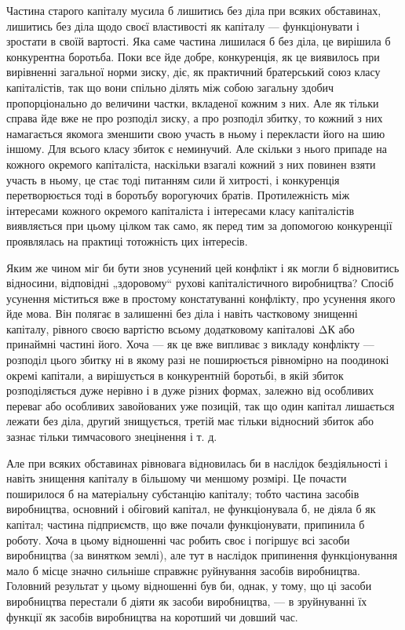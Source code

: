 Частина старого капіталу мусила б лишитись без діла при
всяких обставинах, лишитись без діла щодо своєї властивості як
капіталу — функціонувати і зростати в своїй вартості. Яка саме
частина лишилася б без діла, це вирішила б конкурентна боротьба.
Поки все йде добре, конкуренція, як це виявилось при
вирівненні загальної норми зиску, діє, як практичний братерський
союз класу капіталістів, так що вони спільно ділять між собою загальну
здобич пропорціонально до величини частки, вкладеної
кожним з них. Але як тільки справа йде вже не про розподіл
зиску, а про розподіл збитку, то кожний з них намагається
якомога зменшити свою участь в ньому і перекласти його на
шию іншому. Для всього класу збиток є неминучий. Але скільки
з нього припаде на кожного окремого капіталіста, наскільки
взагалі кожний з них повинен взяти участь в ньому, це стає
тоді питанням сили й хитрості, і конкуренція перетворюється
тоді в боротьбу ворогуючих братів. Протилежність між інтересами
кожного окремого капіталіста і інтересами класу капіталістів виявляється
при цьому цілком так само, як перед тим за допомогою
конкуренції проявлялась на практиці тотожність цих інтересів.

Яким же чином міг би бути знов усунений цей конфлікт
і як могли б відновитись відносини, відповідні „здоровому“
рухові капіталістичного виробництва? Спосіб усунення міститься
вже в простому констатуванні конфлікту, про усунення якого
йде мова. Він полягає в залишенні без діла і навіть частковому
знищенні капіталу, рівного своєю вартістю всьому додатковому
капіталові ΔК або принаймні частині його. Хоча — як
це вже випливає з викладу конфлікту — розподіл цього збитку
ні в якому разі не поширюється рівномірно на поодинокі окремі
капітали, а вирішується в конкурентній боротьбі, в якій збиток
розподіляється дуже нерівно і в дуже різних формах, залежно
від особливих переваг або особливих завойованих уже позицій,
так що один капітал лишається лежати без діла, другий знищується,
третій має тільки відносний збиток або зазнає тільки
тимчасового знецінення і т. д.

Але при всяких обставинах рівновага відновилась би в наслідок
бездіяльності і навіть знищення капіталу в більшому чи
меншому розмірі. Це почасти поширилося б на матеріальну
субстанцію капіталу; тобто частина засобів виробництва, основний
і обіговий капітал, не функціонувала б, не діяла б як капітал;
частина підприємств, що вже почали функціонувати, припинила
б роботу. Хоча в цьому відношенні час робить своє
і погіршує всі засоби виробництва (за винятком землі), але тут
в наслідок припинення функціонування мало б місце значно
сильніше справжнє руйнування засобів виробництва. Головний
результат у цьому відношенні був би, однак, у тому, що ці засоби
виробництва перестали б діяти як засоби виробництва, — в зруйнуванні
їх функції як засобів виробництва на коротший чи довший
час.

